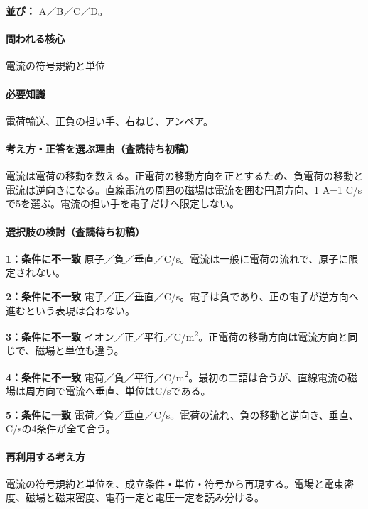 \noindent\textbf{並び：} A／B／C／D。\par

\paragraph{問われる核心} 電流の符号規約と単位

\paragraph{必要知識} 電荷輸送、正負の担い手、右ねじ、アンペア。

\paragraph{考え方・正答を選ぶ理由（査読待ち初稿）} 電流は電荷の移動を数える。正電荷の移動方向を正とするため、負電荷の移動と電流は逆向きになる。直線電流の周囲の磁場は電流を囲む円周方向、1 A=\allowbreak{}1 C/sで5を選ぶ。電流の担い手を電子だけへ限定しない。

\paragraph{選択肢の検討（査読待ち初稿）}\mbox{}\par

\noindent\textbf{1：条件に不一致} 原子／負／垂直／C/s。電流は一般に電荷の流れで、原子に限定されない。\par

\noindent\textbf{2：条件に不一致} 電子／正／垂直／C/s。電子は負であり、正の電子が逆方向へ進むという表現は合わない。\par

\noindent\textbf{3：条件に不一致} イオン／正／平行／C/m\textsuperscript{2}。正電荷の移動方向は電流方向と同じで、磁場と単位も違う。\par

\noindent\textbf{4：条件に不一致} 電荷／負／平行／C/m\textsuperscript{2}。最初の二語は合うが、直線電流の磁場は周方向で電流へ垂直、単位はC/sである。\par

\noindent\textbf{5：条件に一致} 電荷／負／垂直／C/s。電荷の流れ、負の移動と逆向き、垂直、C/sの4条件が全て合う。\par

\paragraph{再利用する考え方} 電流の符号規約と単位を、成立条件・単位・符号から再現する。電場と電束密度、磁場と磁束密度、電荷一定と電圧一定を読み分ける。

